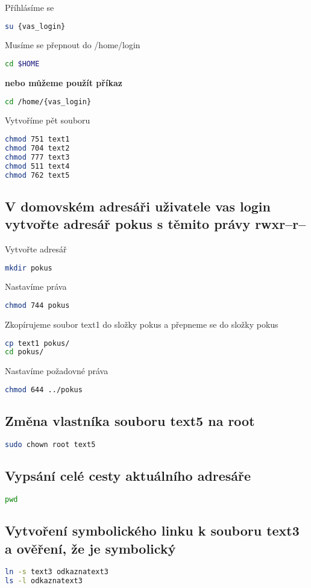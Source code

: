 \documentclass{article}
\begin{document}
Příhlásíme se
\begin{lstlisting}[language=bash]
su {vas_login}
\end{lstlisting}
Musíme se přepnout do /home/{login}
\begin{lstlisting}[language=bash]
cd $HOME
\end{lstlisting}
\textbf{nebo můžeme použít příkaz}
\begin{lstlisting}[language=bash]
cd /home/{vas_login}
\end{lstlisting}
Vytvoříme pět souboru
\begin{lstlisting}[language=bash]
chmod 751 text1
chmod 704 text2
chmod 777 text3
chmod 511 text4
chmod 762 text5
\end{lstlisting}
\subsection{V domovském adresáři uživatele vas login vytvořte adresář pokus s těmito právy rwxr--r--}
Vytvořte adresář
\begin{lstlisting}[language=bash]
mkdir pokus
\end{lstlisting}
Nastavíme práva
\begin{lstlisting}[language=bash]
chmod 744 pokus
\end{lstlisting}
Zkopírujeme soubor text1 do složky pokus a přepneme se do složky pokus
\begin{lstlisting}[language=bash]
cp text1 pokus/
cd pokus/
\end{lstlisting}
Nastavíme požadovné práva
\begin{lstlisting}[language=bash]
chmod 644 ../pokus
\end{lstlisting}
\subsection{Změna vlastníka souboru text5 na root}
\begin{lstlisting}[language=bash]
sudo chown root text5
\end{lstlisting}
\subsection{Vypsání celé cesty aktuálního adresáře}
\begin{lstlisting}[language=bash]
pwd
\end{lstlisting}
\subsection{Vytvoření symbolického linku k souboru text3 a ověření, že je symbolický}
\begin{lstlisting}[language=bash]
ln -s text3 odkaznatext3
ls -l odkaznatext3
\end{lstlisting}
\end{document}

